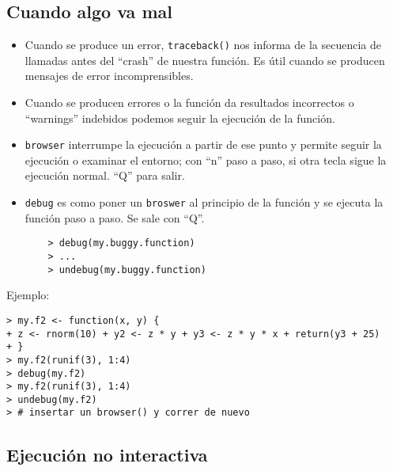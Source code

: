 \newslide

\subsection{Cuando algo va mal}
\begin{itemize}
    \item Cuando se produce un error, \verb"traceback()"
    nos informa de la secuencia de llamadas antes del ``crash''
    de nuestra función.
    Es útil cuando se producen mensajes de error incomprensibles.

    \item Cuando se producen errores o la función da resultados
    incorrectos o ``warnings'' indebidos podemos seguir la ejecución de la función.

    \item \verb"browser" interrumpe la ejecución a partir de
    ese punto y permite seguir la ejecución o examinar el entorno;
    con ``n'' paso a paso, si otra tecla sigue la ejecución normal.
    ``Q'' para salir.

    \item \verb"debug" es como poner un \verb"broswer" al
    principio de la función y se ejecuta la función paso a paso.
    Se sale con ``Q''.
    \begin{verbatim}
    > debug(my.buggy.function)
    > ...
    > undebug(my.buggy.function)
    \end{verbatim}

\end{itemize}

\newslide

Ejemplo:
\begin{verbatim}
> my.f2 <- function(x, y) {
+ z <- rnorm(10) + y2 <- z * y + y3 <- z * y * x + return(y3 + 25)
+ }
> my.f2(runif(3), 1:4)
> debug(my.f2)
> my.f2(runif(3), 1:4)
> undebug(my.f2)
> # insertar un browser() y correr de nuevo
\end{verbatim}

\newslide

\subsection{Ejecución no interactiva}

